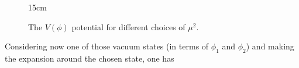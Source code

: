 \begin{figure}[htbp]{15cm}
\caption{The $V(\phi)$ potential for different choices of $\mu^2$.}
 \quad \quad
{}
\label{fig:muPotencial}
\end{figure}

Considering now one of those vacuum states (in terms of $\phi_1$ and $\phi_2$) and making the expansion around the chosen state, one has


